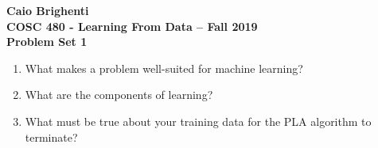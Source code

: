 \documentclass{article}
\begin{document}
\noindent \textbf{Caio Brighenti }\\
\noindent \textbf{COSC 480 - Learning From Data -- Fall 2019}\\%
\noindent \textbf{Problem Set 1}\vspace{1em}\\
\begin{enumerate}
	\item What makes a problem well-suited for machine learning?
	\item What are the components of learning?
	\item What must be true about your training data for the PLA algorithm to terminate?
\end{enumerate}
	
\end{document}
